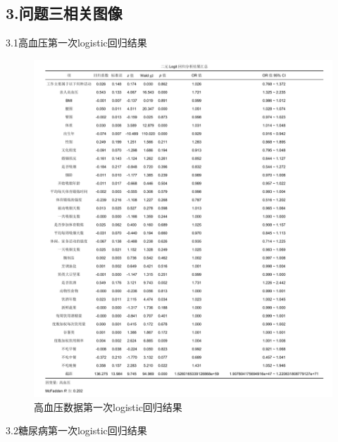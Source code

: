 \documentclass{article}
\numberwithin{equation}{subsection}
\begin{document}
\subsection*{3.问题三相关图像}
3.1高血压第一次logistic回归结果
\begin{figure}[H]
    \centering
    \includegraphics[scale=0.78]{logit1.png}
    \caption{高血压数据第一次logistic回归结果}
\end{figure}
\newpage
3.2糖尿病第一次logistic回归结果
\end{document}
